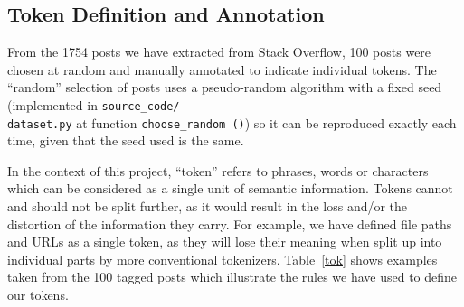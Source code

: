 \subsection{Token Definition and Annotation}

From the 1754 posts we have extracted from Stack Overflow, 100 posts were
chosen at random and manually annotated to indicate individual tokens. The
``random'' selection of posts uses a pseudo-random algorithm with a fixed seed
(implemented in \texttt{source\_code/\\dataset.py} at function
\texttt{choose\_random\,()}) so it can be reproduced exactly each time,
given that the seed used is the same.

In the context of this project, ``token'' refers to phrases, words or
characters which can be considered as a single unit of semantic information.
Tokens cannot and should not be split further, as it would result in the loss
and/or the distortion of the information they carry. For example, we have
defined file paths and URLs as a single token, as they will lose their meaning
when split up into individual parts by more conventional tokenizers.
Table~\ref{tok} shows examples taken from the 100 tagged posts which illustrate
the rules we have used to define our tokens.

